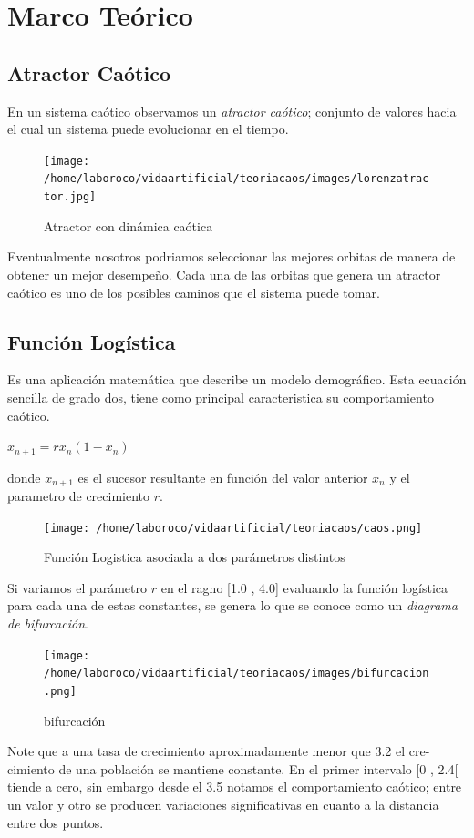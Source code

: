 \documentclass[DIV=calc, paper=a4, fontsize=11pt, twocolumn]{scrartcl}	 %
\begin{document}
\section*{Marco Teórico}
\subsection*{Atractor Caótico}
En un sistema caótico observamos un \emph{atractor caótico}; conjunto de valores hacia el cual un sistema puede evolucionar en el tiempo.
\begin{figure}[htp]
\centering
\texttt{[image: /home/laboroco/vidaartificial/teoriacaos/images/lorenzatractor.jpg]}
\caption{Atractor con dinámica caótica}
\label{atractor de lorenz}
\end{figure}
Eventualmente nosotros podriamos seleccionar las mejores orbitas de manera de obtener un mejor desempeño. Cada una de las orbitas que genera un atractor caótico es uno de los posibles caminos que el sistema puede tomar.
\subsection*{Función Logística}
Es una aplicación matemática que describe un modelo demográfico. Esta ecuación sencilla de grado dos, tiene como principal caracteristica su comportamiento caótico.
\begin{center}$x_{n+1}=rx_n(1-x_n)$\end{center}
donde $x_{n+1}$ es el sucesor resultante en función del valor anterior $x_n$ y el parametro de crecimiento $r$.
\begin{figure}[htp]
\centering
\texttt{[image: /home/laboroco/vidaartificial/teoriacaos/caos.png]}
\caption{Función Logistica asociada a dos parámetros distintos}
\label{}
\end{figure}
Si variamos el parámetro $r$ en el ragno [1.0 , 4.0] evaluando la función logística para cada una de estas constantes, se genera lo que se conoce como un \emph{diagrama de bifurcación}.
\begin{figure}[htp]
\centering
\texttt{[image: /home/laboroco/vidaartificial/teoriacaos/images/bifurcacion.png]}
\caption{bifurcación}
\label{}
\end{figure}
Note que a una tasa de crecimiento aproximadamente menor que 3.2 el cre-cimiento de una población se mantiene constante. En el primer intervalo [0 , 2.4[ tiende a cero, sin embargo desde el 3.5 notamos el comportamiento caótico; entre un valor y otro se producen variaciones significativas en cuanto a la distancia entre dos puntos.
\end{document}
